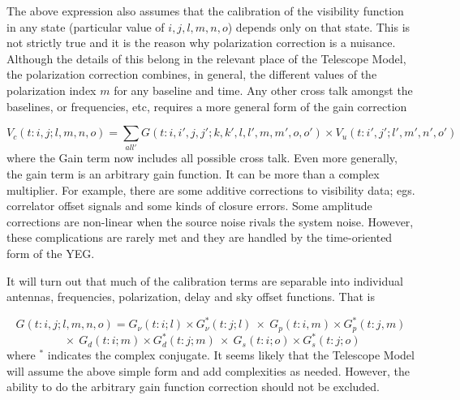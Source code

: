 The above expression also assumes that the calibration of the
visibility function in any state (particular value of $i,j,l,m,n,o$)
depends only on that state.  This is not strictly true and it is the
reason why polarization correction is a nuisance.  Although the
details of this belong in the relevant place of the Telescope Model,
the polarization correction combines, in general, the different values
of the polarization index $m$ for any baseline and time.  Any other
cross talk amongst the baselines, or frequencies, etc, requires a more
general form of the gain correction

$$  V_c(t:i,j;l,m,n,o) = \sum_{all '} G(t:i,i',j,j';k,k',l,l',m,m',o,o')
     \times V_u(t:i',j';l',m',n',o') $$
\mn
where the Gain term now includes all possible cross talk.  Even more
generally, the gain term is an arbitrary gain function.  It can be
more than a complex multiplier.  For example, there are some additive
corrections to visibility data; egs. correlator offset signals and
some kinds of closure errors.  Some amplitude corrections are
non-linear when the source noise rivals the system noise. However,
these complications are rarely met and they are handled by the
time-oriented form of the YEG.

It will turn out that much of the calibration terms are separable into
individual antennas, frequencies, polarization, delay and sky offset
functions.  That is

$$ G(t:i,j;l,m,n,o) =   G_\nu(t:i;l)\times G_\nu^*(t:j;l)~\times~
                        G_p(t:i,m)\times G_p^*(t:j,m) $$
$$              ~\times~G_d(t:i;m)\times G_d^*(t:j;m)
                ~\times~G_s(t:i;o)\times G_s^*(t:j;o)  $$
\sn
where $^*$ indicates the complex conjugate.  It seems likely that the
Telescope Model will assume the above simple form and add complexities
as needed.  However, the ability to do the arbitrary gain function
correction should not be excluded.

